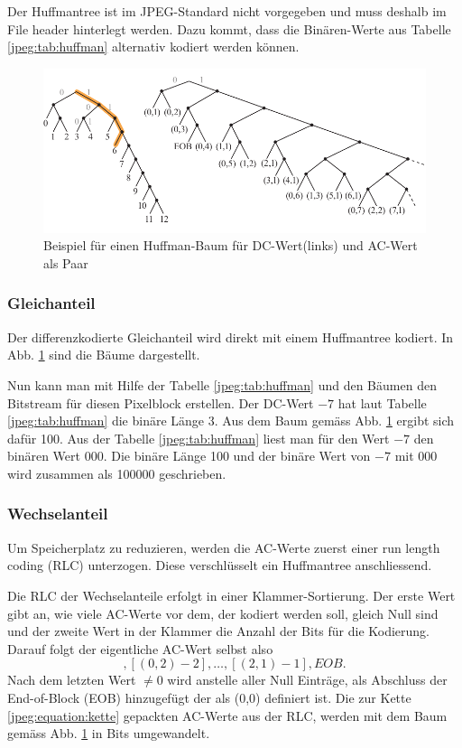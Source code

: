 Der Huffmantree ist im JPEG-Standard nicht vorgegeben und muss deshalb im File header hinterlegt werden.
Dazu kommt, dass die Binären-Werte aus Tabelle \ref{jpeg:tab:huffman} alternativ kodiert werden können.

\begin{figure}[t]
    \centering
    \includegraphics[width=\textwidth]{papers/jpeg/pictures/huffman.pdf}
    \caption{Beispiel für einen Huffman-Baum für DC-Wert(links) und AC-Wert als Paar 
        \label{jpeg:fig:huffman}}
\end{figure}

\subsubsection{Gleichanteil
\label{jpeg:subsubsection:gleichanteil}}
Der differenzkodierte Gleichanteil wird direkt mit einem Huffmantree kodiert.
In Abb. \ref{jpeg:fig:huffman} sind die Bäume dargestellt.


Nun kann man mit Hilfe der Tabelle \ref{jpeg:tab:huffman} und den Bäumen den Bitstream für diesen Pixelblock erstellen.
Der DC-Wert \(-7\) hat laut Tabelle \ref{jpeg:tab:huffman} die binäre Länge 3.
Aus dem Baum gemäss Abb. \ref{jpeg:fig:huffman} ergibt sich dafür 100.
Aus der Tabelle \ref{jpeg:tab:huffman} liest man für den Wert \(-7\) den binären Wert 000.
Die binäre Länge 100 und der binäre Wert von \(-7\) mit 000 wird zusammen als 100000 geschrieben.

\subsubsection{Wechselanteil
\label{jpeg:subsubsection:wechselanteil}}
Um Speicherplatz zu reduzieren, werden die AC-Werte zuerst einer run length coding (RLC) unterzogen.
Diese verschlüsselt ein Huffmantree anschliessend.

Die RLC der Wechselanteile erfolgt in einer Klammer-Sortierung.
Der erste Wert gibt an, wie viele AC-Werte vor dem, der kodiert werden soll, gleich Null sind und der zweite Wert in der Klammer die Anzahl der Bits für die Kodierung.
Darauf folgt der eigentliche AC-Wert selbst also 
\begin{equation}
    [(0,3)5],[(0,2)-2], \dots, [(2,1)-1], EOB.
    \label{jpeg:equation:kette}
\end{equation}
Nach dem letzten Wert \(\neq 0\) wird anstelle aller Null Einträge, als Abschluss der End-of-Block (EOB) hinzugefügt der als (0,0) definiert ist.
Die zur Kette \eqref{jpeg:equation:kette} gepackten AC-Werte aus der RLC, werden mit dem Baum gemäss Abb. \ref{jpeg:fig:huffman} in Bits umgewandelt.

